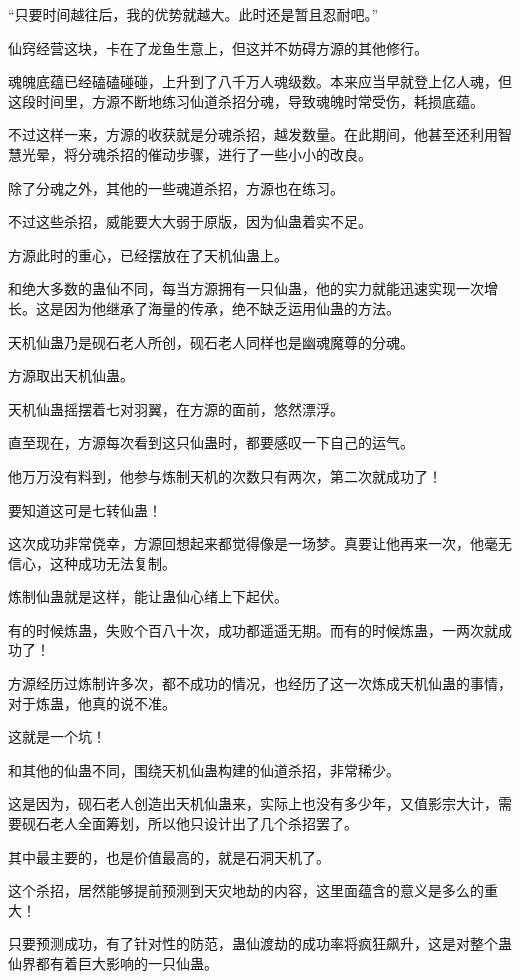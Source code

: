 \begin{this_body}
“只要时间越往后，我的优势就越大。此时还是暂且忍耐吧。”

仙窍经营这块，卡在了龙鱼生意上，但这并不妨碍方源的其他修行。

魂魄底蕴已经磕磕碰碰，上升到了八千万人魂级数。本来应当早就登上亿人魂，但这段时间里，方源不断地练习仙道杀招分魂，导致魂魄时常受伤，耗损底蕴。

不过这样一来，方源的收获就是分魂杀招，越发数量。在此期间，他甚至还利用智慧光晕，将分魂杀招的催动步骤，进行了一些小小的改良。

除了分魂之外，其他的一些魂道杀招，方源也在练习。

不过这些杀招，威能要大大弱于原版，因为仙蛊着实不足。

方源此时的重心，已经摆放在了天机仙蛊上。

和绝大多数的蛊仙不同，每当方源拥有一只仙蛊，他的实力就能迅速实现一次增长。这是因为他继承了海量的传承，绝不缺乏运用仙蛊的方法。

天机仙蛊乃是砚石老人所创，砚石老人同样也是幽魂魔尊的分魂。

方源取出天机仙蛊。

天机仙蛊摇摆着七对羽翼，在方源的面前，悠然漂浮。

直至现在，方源每次看到这只仙蛊时，都要感叹一下自己的运气。

他万万没有料到，他参与炼制天机的次数只有两次，第二次就成功了！

要知道这可是七转仙蛊！

这次成功非常侥幸，方源回想起来都觉得像是一场梦。真要让他再来一次，他毫无信心，这种成功无法复制。

炼制仙蛊就是这样，能让蛊仙心绪上下起伏。

有的时候炼蛊，失败个百八十次，成功都遥遥无期。而有的时候炼蛊，一两次就成功了！

方源经历过炼制许多次，都不成功的情况，也经历了这一次炼成天机仙蛊的事情，对于炼蛊，他真的说不准。

这就是一个坑！

和其他的仙蛊不同，围绕天机仙蛊构建的仙道杀招，非常稀少。

这是因为，砚石老人创造出天机仙蛊来，实际上也没有多少年，又值影宗大计，需要砚石老人全面筹划，所以他只设计出了几个杀招罢了。

其中最主要的，也是价值最高的，就是石洞天机了。

这个杀招，居然能够提前预测到天灾地劫的内容，这里面蕴含的意义是多么的重大！

只要预测成功，有了针对性的防范，蛊仙渡劫的成功率将疯狂飙升，这是对整个蛊仙界都有着巨大影响的一只仙蛊。


\end{this_body}
